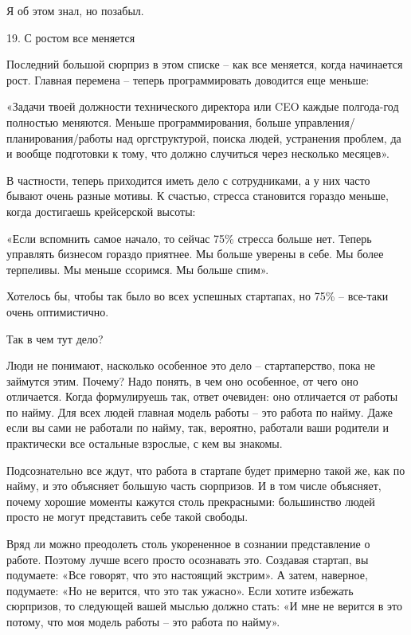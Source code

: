 \documentclass[ebook,12pt,oneside,openany]{memoir}
\begin{document}
Я об этом знал, но позабыл.

19. С ростом все меняется

Последний большой сюрприз в этом списке – как все меняется, когда
начинается рост. Главная перемена – теперь программировать доводится
еще меньше:

«Задачи твоей должности технического директора или CEO каждые
полгода-год полностью меняются. Меньше программирования, больше
управления/планирования/работы над оргструктурой, поиска людей,
устранения проблем, да и вообще подготовки к тому, что должно
случиться через несколько месяцев».

В частности, теперь приходится иметь дело с сотрудниками, а у них
часто бывают очень разные мотивы. К счастью, стресса становится
гораздо меньше, когда достигаешь крейсерской высоты:

«Если вспомнить самое начало, то сейчас 75\% стресса больше нет.
Теперь управлять бизнесом гораздо приятнее. Мы больше уверены в себе.
Мы более терпеливы. Мы меньше ссоримся. Мы больше спим».

Хотелось бы, чтобы так было во всех успешных стартапах, но 75\% –
все-таки очень оптимистично.

Так в чем тут дело?

Люди не понимают, насколько особенное это дело – стартаперство, пока
не займутся этим. Почему? Надо понять, в чем оно особенное, от чего
оно отличается. Когда формулируешь так, ответ очевиден: оно отличается
от работы по найму. Для всех людей главная модель работы – это работа
по найму. Даже если вы сами не работали по найму, так, вероятно,
работали ваши родители и практически все остальные взрослые, с кем вы
знакомы.

Подсознательно все ждут, что работа в стартапе будет примерно такой
же, как по найму, и это объясняет большую часть сюрпризов. И в том
числе объясняет, почему хорошие моменты кажутся столь прекрасными:
большинство людей просто не могут представить себе такой свободы.

Вряд ли можно преодолеть столь укорененное в сознании представление о
работе. Поэтому лучше всего просто осознавать это. Создавая стартап,
вы подумаете: «Все говорят, что это настоящий экстрим». А затем,
наверное, подумаете: «Но не верится, что это так ужасно». Если хотите
избежать сюрпризов, то следующей вашей мыслью должно стать: «И мне не
верится в это потому, что моя модель работы – это работа по найму».
\end{document}
